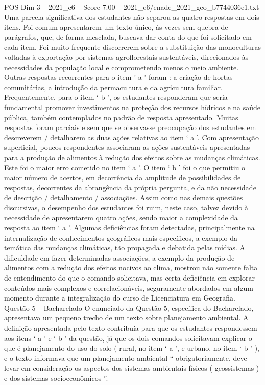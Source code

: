\begin{textsample}{POS Dim 3 – 2021\_c6 – Score 7.00 – 2021\_c6/enade\_2021\_geo\_b7744036e1.txt}
Uma parcela significativa dos estudantes não separou as quatro respostas em dois itens.
Foi comum apresentarem um texto único, às vezes sem quebra de parágrafos, que, de forma mesclada, buscava dar conta do que foi solicitado em cada item.
Foi muito frequente discorrerem sobre a substituição das monoculturas voltadas à exportação por sistemas agroflorestais sustentáveis, direcionados às necessidades da população local e comprometendo menos o meio ambiente.
Outras respostas recorrentes para o item ’ a ’ foram : a criação de hortas comunitárias, a introdução da permacultura e da agricultura familiar.
Frequentemente, para o item ‘ b ’, os estudantes responderam que seria fundamental promover investimentos na proteção dos recursos hídricos e na saúde pública, também contemplados no padrão de resposta apresentado.
Muitas respostas foram parciais e sem que se observasse preocupação dos estudantes em descreverem / detalharem as duas ações relativas ao item ‘ a ’.
Com apresentação superficial, poucos respondentes associaram as ações sustentáveis apresentadas para a produção de alimentos à redução dos efeitos sobre as mudanças climáticas.
Este foi o maior erro cometido no item ‘ a ’.
O item ‘ b ’ foi o que permitiu o maior número de acertos, em decorrência da amplitude de possibilidades de respostas, decorrentes da abrangência da própria pergunta, e da não necessidade de descrição / detalhamento / associações.
Assim como nas demais questões discursivas, o desempenho dos estudantes foi ruim, neste caso, talvez devido à necessidade de apresentarem quatro ações, sendo maior a complexidade da resposta ao item ‘ a ’.
Algumas deficiências foram detectadas, principalmente na internalização de conhecimentos geográficos mais específicos, a exemplo da temática das mudanças climáticas, tão propagada e debatida pelas mídias.
A dificuldade em fazer determinadas associações, a exemplo da produção de alimentos com a redução dos efeitos nocivos ao clima, mostrou não somente falta de entendimento do que o comando solicitava, mas certa deficiência em explorar conteúdos mais complexos e correlacionáveis, seguramente abordados em algum momento durante a integralização do curso de Licenciatura em Geografia.
Questão 5 – Bacharelado O enunciado da Questão 5, específica do Bacharelado, apresentava um pequeno trecho de um texto sobre planejamento ambiental.
A definição apresentada pelo texto contribuía para que os estudantes respondessem aos itens ‘ a ’ e ‘ b ’ da questão, já que os dois comandos solicitavam explicar o que é planejamento do uso do solo ( rural, no item ‘ a ’, e urbano, no item ‘ b ’ ), e o texto informava que um planejamento ambiental “ obrigatoriamente, deve levar em consideração os aspectos dos sistemas ambientais físicos ( geossistemas ) e dos sistemas socioeconômicos ”.

\end{textsample}

